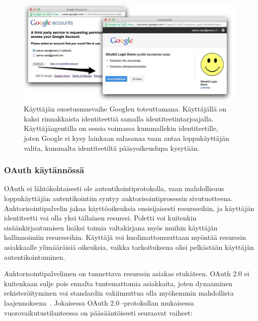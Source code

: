 \documentclass[finnish,gradu]{tktltiki}
\begin{document}


  \begin{figure}
    \centering
    \includegraphics[width=1.0\textwidth]{images/google_id_and_user_consent.jpg}
    \caption{Käyttäjän suostusmusvaihe Googlen toteuttamana. Käyttäjällä on kaksi rinnakkaista identiteettiä samalla identiteetintarjoajalla. Käyttäjäagentilla on sessio voimassa kummallekin identiteetille, joten Google ei kysy lainkaan salasanaa vaan antaa loppukäyttäjän valita, kummalta identiteetiltä pääsyoikeuslupa kysytään.}
    \label{fig:google_id_and_user_consent}
  \end{figure}


  \subsubsection{OAuth käytännössä} %
  \label{ssub:oauth_käytännössä}

  OAuth ei lähtökohtaisesti ole autentikointiprotokolla, vaan mahdollisuus loppukäyttäjän autentikointiin syntyy auktorisointiprosessin sivutuotteena. Auktorisointipalvelin jakaa käyttöoikeuksia ensisijaisesti resursseihin, ja käyttäjän identiteetti voi olla yksi tällainen resurssi. Poletti voi kuitenkin sisäänkirjautumisen lisäksi toimia valtakirjana myös muihin käyttäjän hallinnoimiin resursseihin. Käyttäjä voi huolimattomuuttaan myöntää resurssin asiakkaalle ylimääräisiä oikeuksia, vaikka tarkoituksena olisi pelkästään käyttäjän autentikointuminen.

  Auktorisointipalvelimen on tunnettava resurssin asiakas etukäteen. OAuth 2.0 ei kuitenkaan sulje pois ennalta tuntemattomia asiakkaita, joten dynaaminen rekisteröityminen voi standardin vakiinnuttua olla myöhemmin mahdollista laajennoksena~\cite{ietf_oauth2_unregistered_clients}. Jokaisessa OAuth 2.0 -protokollan mukaisessa vuorovaikutustilanteessa on pääsääntöisesti seuraavat vaiheet:
\end{document}
